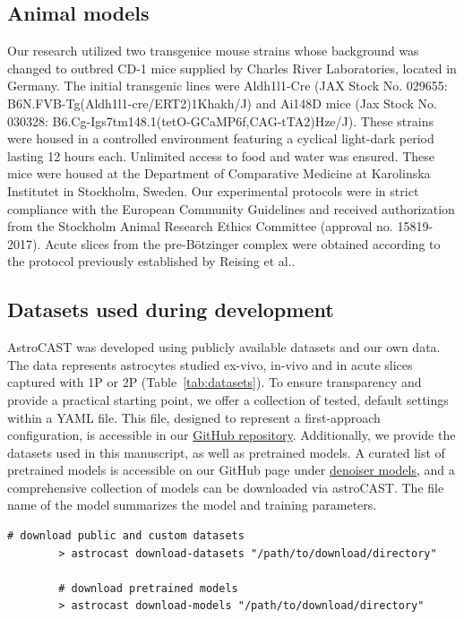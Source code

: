 \documentclass[utf8]{FrontiersinHarvard}
\newcommand{\tref}[1]{ (Table~\ref{tab:#1})}
\begin{document}
    \subsection{Animal models}
    Our research utilized two transgenice mouse strains whose background was changed to outbred CD-1 mice supplied by Charles River Laboratories, located in Germany. The initial transgenic lines were Aldh1l1-Cre (JAX Stock No. 029655: B6N.FVB-Tg(Aldh1l1-cre/ERT2)1Khakh/J) and Ai148D mice (Jax Stock No. 030328: B6.Cg-Igs7tm148.1(tetO-GCaMP6f,CAG-tTA2)Hze/J). These strains were housed in a controlled environment featuring a cyclical light-dark period lasting 12 hours each. Unlimited access to food and water was ensured. These mice were housed at the Department of Comparative Medicine at Karolinska Institutet in Stockholm, Sweden. Our experimental protocols were in strict compliance with the European Community Guidelines and received authorization from the Stockholm Animal Research Ethics Committee (approval no. 15819-2017). Acute slices from the pre-Bötzinger complex were obtained according to the protocol previously established by Reising et al.\citep{reising_prostaglandin_2022}.

    \subsection{Datasets used during development}
    \label{ref:dataset-availability}

    AstroCAST was developed using publicly available datasets and our own data. The data represents astrocytes studied ex-vivo, in-vivo and in acute slices captured with \ac{1P} or \ac{2P}\tref{datasets}. To ensure transparency and provide a practical starting point, we offer a collection of tested, default settings within a YAML file. This file, designed to represent a first-approach configuration, is accessible in our \href{https://github.com/janreising/astroCAST}{GitHub repository}. Additionally, we provide the datasets used in this manuscript, as well as pretrained models. A curated list of pretrained models is accessible on our GitHub page under \href{https://github.com/janreising/astroCAST/tree/main/denoiser_models}{denoiser models}, and a comprehensive collection of models can be downloaded via astroCAST. The file name of the model summarizes the model and training parameters.

    \begin{lstlisting}[style=bashStyle]
        # download public and custom datasets
        > astrocast download-datasets "/path/to/download/directory"

        # download pretrained models
        > astrocast download-models "/path/to/download/directory"
    \end{lstlisting}
\end{document}
